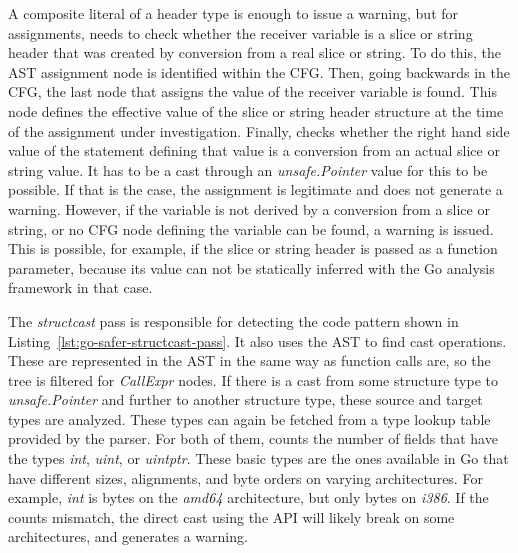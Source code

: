 A composite literal of a header type is enough to issue a warning, but for assignments, \toolSafer{} needs to check
whether the receiver variable is a slice or string header that was created by conversion from a real slice or string.
To do this, the \acrshort{AST} assignment node is identified within the \acrshort{CFG}.
Then, going backwards in the \acrshort{CFG}, the last node that assigns the value of the receiver variable is found.
This node defines the effective value of the slice or string header structure at the time of the assignment under
investigation.
Finally, \toolSafer{} checks whether the right hand side value of the statement defining that value is a conversion
from an actual slice or string value.
It has to be a cast through an \textit{unsafe.Pointer} value for this to be possible.
If that is the case, the assignment is legitimate and \toolSafer{} does not generate a warning.
However, if the variable is not derived by a conversion from a slice or string, or no \acrshort{CFG} node defining the
variable can be found, a warning is issued.
This is possible, for example, if the slice or string header is passed as a function parameter, because its value can
not be statically inferred with the Go analysis framework in that case.

The \textit{structcast} pass is responsible for detecting the code pattern shown in
Listing~\ref{lst:go-safer-structcast-pass}.
It also uses the \acrshort{AST} to find cast operations.
These are represented in the \acrshort{AST} in the same way as function calls are, so the tree is filtered for
\textit{CallExpr} nodes.
If there is a cast from some structure type to \textit{unsafe.Pointer} and further to another structure type, these
source and target types are analyzed.
These types can again be fetched from a type lookup table provided by the parser.
For both of them, \toolSafer{} counts the number of fields that have the types \textit{int}, \textit{uint}, or
\textit{uintptr}.
These  basic types are the ones available in Go that have different sizes, alignments, and byte orders
on varying architectures.
For example, \textit{int} is  bytes on the \textit{amd64} architecture, but only  bytes
on \textit{i386}.
If the counts mismatch, the direct cast using the \unsafe{} \acrshort{API} will likely break on some architectures,
and \toolSafer{} generates a warning.



